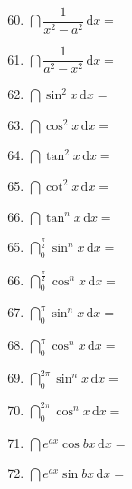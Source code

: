 \documentclass[a4paper,12pt]{article}
\begin{document}
    \begin{minipage}[t]{0.30\textwidth}
        \begin{enumerate}[leftmargin=*, itemsep=1.1em]
            \setcounter{enumi}{59}
            \item $\dint \dfrac{1}{x^2 - a^2}\,\mathrm{d}x =$
            \item $\dint \dfrac{1}{a^2 - x^2}\,\mathrm{d}x =$
        \end{enumerate}
    \end{minipage}
    \hfill
    \begin{minipage}[t]{0.30\textwidth}
        \begin{enumerate}[leftmargin=*, itemsep=1.1em]
            \setcounter{enumi}{61}
            \item $\dint \sin^2 x\,\mathrm{d}x =$
            \item $\dint \cos^2 x\,\mathrm{d}x =$
        \end{enumerate}
    \end{minipage}
    \hfill
    \begin{minipage}[t]{0.30\textwidth}
        \begin{enumerate}[leftmargin=*, itemsep=1.1em]
            \setcounter{enumi}{63}
            \item $\dint \tan^2 x\,\mathrm{d}x =$
            \item $\dint \cot^2 x\,\mathrm{d}x =$
            \item $\dint \tan^n x\,\mathrm{d}x =$
        \end{enumerate}
    \end{minipage}
    \hfill

    \vspace{1em}

    \begin{minipage}[t]{0.46\textwidth}
        \begin{enumerate}[leftmargin=*, itemsep=1.1em]
            \setcounter{enumi}{64}
            \item $\dint_{0}^{\frac{\pi}{2}} \sin^{n} x \,\mathrm{d}x =$
            \item $\dint_{0}^{\frac{\pi}{2}} \cos^{n} x \,\mathrm{d}x =$
            \item $\dint_{0}^{\pi} \sin^{n} x \,\mathrm{d}x = $
            \item $\dint_{0}^{\pi} \cos^{n} x \,\mathrm{d}x =$
        \end{enumerate}
    \end{minipage}
    \hfill
    \begin{minipage}[t]{0.46\textwidth}
        \begin{enumerate}[leftmargin=*, itemsep=1.1em]
            \setcounter{enumi}{68}
            \item $\dint_{0}^{2\pi} \sin^{n} x \,\mathrm{d}x =$
            \item $\dint_{0}^{2\pi} \cos^{n} x \,\mathrm{d}x =$
            \item $\dint e^{ax} \cos bx \,\mathrm{d}x =$
            \item $\dint e^{ax} \sin bx \,\mathrm{d}x =$
        \end{enumerate}
    \end{minipage}
\end{document}
